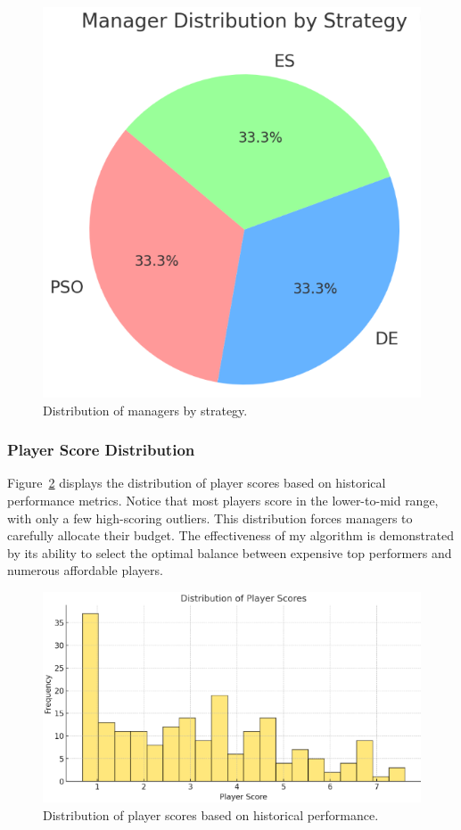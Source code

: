 \documentclass[sigconf]{acmart}
\begin{document}
\begin{figure}[H]
	\centering
	\includegraphics[width=0.6\linewidth]{plot/manager_distribution.png}
	\caption{Distribution of managers by strategy.}
	\label{fig:manager_distribution}
\end{figure}

\subsubsection{Player Score Distribution}
Figure~\ref{fig:player_scores} displays the distribution of player scores based on historical performance metrics. Notice that most players score in the lower-to-mid range, with only a few high-scoring outliers. This distribution forces managers to carefully allocate their budget. The effectiveness of my algorithm is demonstrated by its ability to select the optimal balance between expensive top performers and numerous affordable players.

\begin{figure}[H]
	\centering
	\includegraphics[width=0.8\linewidth]{plot/player_score_distribution.png}
	\caption{Distribution of player scores based on historical performance.}
	\label{fig:player_scores}
\end{figure}
\end{document}
